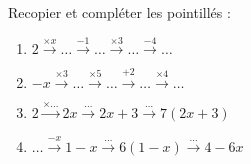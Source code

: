
\begin{exercice}\label{exosmath-0982}

    Recopier et compléter les pointillés :
    \begin{enumerate}
        \item
        $2\stackrel{\times x}{\longrightarrow}\ldots\stackrel{-1}{\longrightarrow}\ldots\stackrel{\times 3}{\longrightarrow}\ldots\stackrel{-4}{\longrightarrow}\ldots$
    \item
        \( -x\stackrel{\times 3}{\longrightarrow}\ldots\stackrel{\times 5}{\longrightarrow}\ldots\stackrel{+2}{\longrightarrow}  \ldots\stackrel{\times 4}{\longrightarrow}\ldots\)
    \item
        \( 2\stackrel{ \times \ldots }{\longrightarrow}2x\stackrel{\ldots}{\longrightarrow}2x+3\stackrel{\ldots}{\longrightarrow}  7(2x+3)\)
    \item
        \( \ldots\stackrel{ -x }{\longrightarrow}1-x\stackrel{\ldots}{\longrightarrow}6(1-x)\stackrel{\ldots}{\longrightarrow}  4-6x\)

    \end{enumerate}
\end{exercice}
